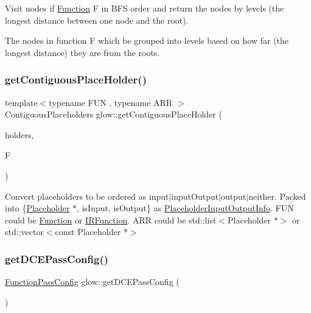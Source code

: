 Visit nodes if \hyperlink{classglow_1_1_function}{Function} {\ttfamily F} in B\+FS order and return the nodes by levels (the longest distance between one node and the root).

The nodes in function {\ttfamily F} which be grouped into levels based on how far (the longest distance) they are from the roots. \mbox{\label{namespaceglow_ac81027b5844dd48c60ba42e8169f19c2}} 
\subsubsection{\texorpdfstring{get\+Contiguous\+Place\+Holder()}{getContiguousPlaceHolder()}}
{\footnotesize\ttfamily template$<$typename F\+UN , typename A\+RR $>$ \\
Contiguous\+Placeholders glow\+::get\+Contiguous\+Place\+Holder (\begin{DoxyParamCaption}\item[{const A\+RR \&}]{holders,  }\item[{const F\+UN \&}]{F }\end{DoxyParamCaption})}

Convert placeholders to be ordered as input$\vert$input\+Output$\vert$output$\vert$neither. Packed into \{\hyperlink{classglow_1_1_placeholder}{Placeholder} $\ast$, is\+Input, is\+Output\} as \hyperlink{structglow_1_1_placeholder_input_output_info}{Placeholder\+Input\+Output\+Info}. F\+UN could be \hyperlink{classglow_1_1_function}{Function} or \hyperlink{classglow_1_1_i_r_function}{I\+R\+Function}. A\+RR could be std\+::list$<$\+Placeholder $\ast$$>$ or std\+::vector$<$const Placeholder $\ast$$>$ \mbox{\label{namespaceglow_a4fef74193703ceb204297b6993af8081}} 
\subsubsection{\texorpdfstring{get\+D\+C\+E\+Pass\+Config()}{getDCEPassConfig()}}
{\footnotesize\ttfamily \hyperlink{classglow_1_1_function_pass_config}{Function\+Pass\+Config} glow\+::get\+D\+C\+E\+Pass\+Config (\begin{DoxyParamCaption}{ }\end{DoxyParamCaption})}

